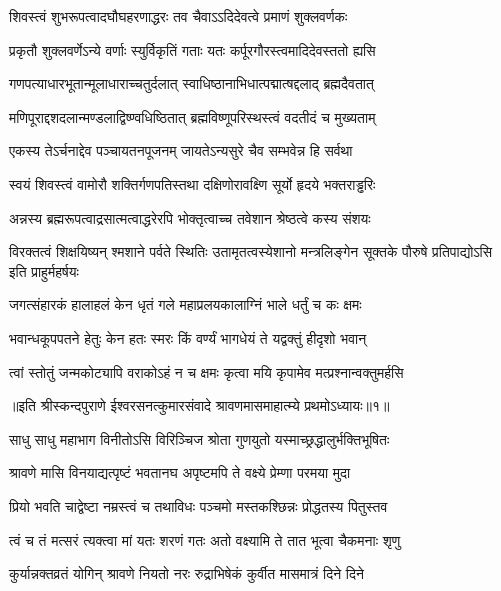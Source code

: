 \twolineshloka
{शिवस्त्वं शुभरूपत्वादघौघहरणाद्धरः}
{तव चैवाऽऽदिदेवत्वे प्रमाणं शुक्लवर्णकः} %

\twolineshloka
{प्रकृतौ शुक्लवर्णेऽन्ये वर्णाः स्युर्विकृतिं गताः}
{यतः कर्पूरगौरस्त्वमादिदेवस्ततो ह्यसि} %

\twolineshloka
{गणपत्याधारभूतान्मूलाधाराच्चतुर्दलात्}
{स्वाधिष्ठानाभिधात्पद्मात्षद्दलाद् ब्रह्मदैवतात्} %

\twolineshloka
{मणिपूराद्दशदलान्मण्डलाद्विष्ण्वधिष्ठितात्}
{ब्रह्मविष्णूपरिस्थस्त्वं वदतीदं च मुख्यताम्} %

\twolineshloka
{एकस्य तेऽर्चनाद्देव पञ्चायतनपूजनम्}
{जायतेऽन्यसुरे चैव सम्भवेन्न हि सर्वथा} %

\twolineshloka
{स्वयं शिवस्त्वं वामोरौ शक्तिर्गणपतिस्तथा}
{दक्षिणोरावक्ष्णि सूर्यो हृदये भक्तराड्ढरिः} %

\twolineshloka
{अन्नस्य ब्रह्मरूपत्वाद्रसात्मत्वाद्धरेरपि}
{भोक्तृत्वाच्च तवेशान श्रेष्ठत्वे कस्य संशयः} %


\threelineshloka
{विरक्तत्वं शिक्षयिष्यन् श्मशाने पर्वते स्थितिः}
{उतामृतत्वस्येशानो मन्त्रलिङ्गेन सूक्तके}
{पौरुषे प्रतिपाद्योऽसि इति प्राहुर्महर्षयः} %

\twolineshloka
{जगत्संहारकं हालाहलं केन धृतं गले}
{महाप्रलयकालाग्निं भाले धर्तुं च कः क्षमः} %

\twolineshloka
{भवान्धकूपपतने हेतुः केन हतः स्मरः}
{किं वर्ण्यं भागधेयं ते यद्वक्तुं हीदृशो भवान्} %

\twolineshloka
{त्वां स्तोतुं जन्मकोट्यापि वराकोऽहं न च क्षमः}
{कृत्वा मयि कृपामेव मत्प्रश्नान्वक्तुमर्हसि} %


{॥इति श्रीस्कन्दपुराणे ईश्वरसनत्कुमारसंवादे श्रावणमासमाहात्म्ये प्रथमोऽध्यायः॥१॥}




\twolineshloka
{साधु साधु महाभाग विनीतोऽसि विरिञ्चिज}
{श्रोता गुणयुतो यस्माच्छ्रद्धालुर्भक्तिभूषितः} %

\twolineshloka
{श्रावणे मासि विनयाद्यत्पृष्टं भवतानघ}
{अपृष्टमपि ते वक्ष्ये प्रेम्णा परमया मुदा} %

\twolineshloka
{प्रियो भवति चाद्वेष्टा नम्रस्त्वं च तथाविधः}
{पञ्चमो मस्तकश्छिन्नः प्रोद्धतस्य पितुस्तव} %

\twolineshloka
{त्वं च तं मत्सरं त्यक्त्वा मां यतः शरणं गतः}
{अतो वक्ष्यामि ते तात भूत्वा चैकमनाः शृणु} %

\twolineshloka
{कुर्यान्नक्तव्रतं योगिन् श्रावणे नियतो नरः}
{रुद्राभिषेकं कुर्वीत मासमात्रं दिने दिने} %


